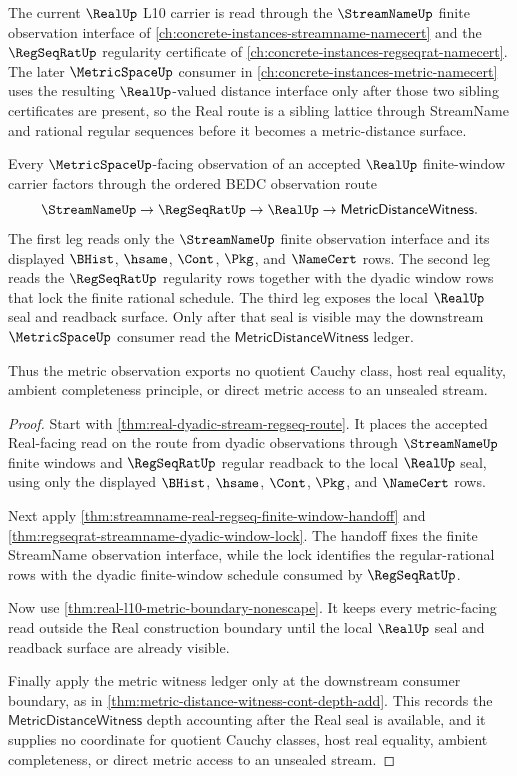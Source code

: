 The current $\RealUp$ L10 carrier is read through the $\StreamNameUp$ finite observation interface of \autoref{ch:concrete-instances-streamname-namecert} and the $\RegSeqRatUp$ regularity certificate of \autoref{ch:concrete-instances-regseqrat-namecert}. The later $\MetricSpaceUp$ consumer in \autoref{ch:concrete-instances-metric-namecert} uses the resulting $\RealUp$-valued distance interface only after those two sibling certificates are present, so the Real route is a sibling lattice through StreamName and rational regular sequences before it becomes a metric-distance surface.

\begin{theorem}
\label{thm:real-streamname-regseqrat-metric-observation-factorization}
Every $\MetricSpaceUp$-facing observation of an accepted $\RealUp$
finite-window carrier factors through the ordered BEDC observation route
$$
\StreamNameUp \to \RegSeqRatUp \to \RealUp \to
\mathsf{MetricDistanceWitness}.
$$
The first leg reads only the $\StreamNameUp$ finite observation interface and
its displayed $\BHist$, $\hsame$, $\Cont$, $\Pkg$, and $\NameCert$ rows. The
second leg reads the $\RegSeqRatUp$ regularity rows together with the dyadic
window rows that lock the finite rational schedule. The third leg exposes the
local $\RealUp$ seal and readback surface. Only after that seal is visible may
the downstream $\MetricSpaceUp$ consumer read the
$\mathsf{MetricDistanceWitness}$ ledger.

Thus the metric observation exports no quotient Cauchy class, host real
equality, ambient completeness principle, or direct metric access to an
unsealed stream.
\end{theorem}
\begin{proof}
Start with \autoref{thm:real-dyadic-stream-regseq-route}. It places the
accepted Real-facing read on the route from dyadic observations through
$\StreamNameUp$ finite windows and $\RegSeqRatUp$ regular readback to the
local $\RealUp$ seal, using only the displayed $\BHist$, $\hsame$, $\Cont$,
$\Pkg$, and $\NameCert$ rows.

Next apply \autoref{thm:streamname-real-regseq-finite-window-handoff} and
\autoref{thm:regseqrat-streamname-dyadic-window-lock}. The handoff fixes the
finite StreamName observation interface, while the lock identifies the
regular-rational rows with the dyadic finite-window schedule consumed by
$\RegSeqRatUp$.

Now use \autoref{thm:real-l10-metric-boundary-nonescape}. It keeps every
metric-facing read outside the Real construction boundary until the local
$\RealUp$ seal and readback surface are already visible.

Finally apply the metric witness ledger only at the downstream consumer
boundary, as in \autoref{thm:metric-distance-witness-cont-depth-add}. This
records the $\mathsf{MetricDistanceWitness}$ depth accounting after the Real
seal is available, and it supplies no coordinate for quotient Cauchy classes,
host real equality, ambient completeness, or direct metric access to an
unsealed stream.
\end{proof}


